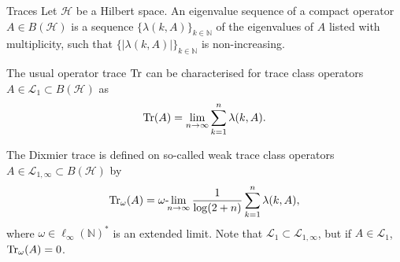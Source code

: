 \documentclass{beamer}
\numberwithin{equation}{section}
\theoremstyle{plain}
\theoremstyle{plain}
\theoremstyle{definition}
\theoremstyle{plain}
\theoremstyle{plain}
\theoremstyle{definition}
\newcommand{\abs}[1]{\left|#1\right|}
\newcommand{\tr}{{\rm Tr}}
\begin{document}
\begin{frame}{Traces}
    Let $\mathcal{H}$ be a Hilbert space. An eigenvalue sequence of a compact operator $A\in B(\mathcal{H})$ is a sequence $\{\lambda(k,A)\}_{k\in \mathbb{N}}$ of the eigenvalues of $A$ listed with multiplicity, such that $\{\abs{\lambda(k,A)}\}_{k\in \mathbb{N}}$ is non-increasing.
    \bigskip
    
    The usual operator trace $\tr$ can be characterised for trace class operators $A\in \mathcal{L}_1 \subset B(\mathcal{H})$ as \[\tr(A) = \lim_{n\to \infty} \sum_{k=1}^n \lambda(k,A). \] 
    
    \bigskip
    
    The Dixmier trace is defined on so-called weak trace class operators $A\in \mathcal{L}_{1,\infty} \subset B(\mathcal{H})$ by 
    \[
    \tr_\omega (A) = \omega{ \text -}\! \!\lim_{n\to\infty} \frac{1}{\log(2+n)}\sum_{k=1}^n \lambda(k,A),
    \] where $\omega \in \ell_{\infty}(\mathbb{N})^*$ is an extended limit. Note that $\mathcal{L}_1 \subset \mathcal{L}_{1,\infty}$, but if $A \in \mathcal{L}_1$, $\tr_\omega(A)=0$.
\end{frame}
% 
% 
%     
%     
% 
\end{document}
